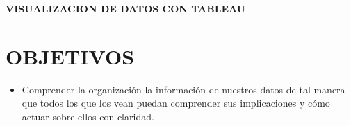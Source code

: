\documentclass[12pt,letterpaper]{article}
\begin{document}
    \newpage
    \begin{LARGE}
        \begin{center}
            \textbf{VISUALIZACION DE DATOS CON TABLEAU} \\
        \end{center}
    \end{LARGE}
    \section{OBJETIVOS}
    \begin{itemize}
        \item Comprender la organización la información de nuestros datos de tal manera que todos los que los vean puedan comprender sus implicaciones y cómo actuar sobre ellos con claridad.
    \end{itemize}
\end{document}
